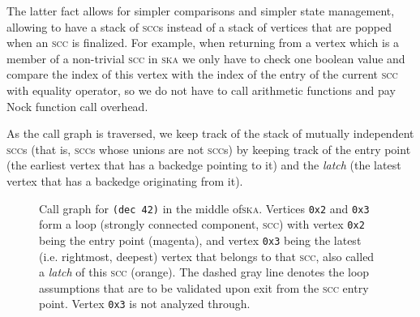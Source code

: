 \documentclass[twoside]{article}
\begin{document}
The latter fact allows for simpler comparisons and simpler state management, allowing to have a stack of \textsc{scc}s instead of a stack of vertices that are popped when an \textsc{scc} is finalized. For example, when returning from a vertex which is a member of a non-trivial \textsc{scc} in \textsc{ska} we only have to check one boolean value and compare the index of this vertex with the index of the entry of the current \textsc{scc} with equality operator, so we do not have to call arithmetic functions and pay Nock function call overhead.

As the call graph is traversed, we keep track of the stack of mutually independent \textsc{scc}s (that is, \textsc{scc}s whose unions are not \textsc{scc}s) by keeping track of
the entry point (the earliest vertex that has a backedge pointing to it) and the
\emph{latch} (the latest vertex that has a backedge originating from it).

\begin{figure}[h]
  \centering
  \caption{Call graph for \texttt{(dec 42)} in the middle of\textsc{ska}. Vertices \texttt{0x2} and \texttt{0x3} form a loop (strongly connected component, \textsc{scc}) with vertex \texttt{0x2} being the entry point (magenta), and vertex \texttt{0x3} being the latest (i.e. rightmost, deepest) vertex that belongs to that \textsc{scc}, also called a \emph{latch} of this \textsc{scc} (orange). The dashed gray line denotes the loop assumptions that are to be validated upon exit from the \textsc{scc} entry point. Vertex \texttt{0x3} is not analyzed through.}
  \label{fig:dec-ska}
\end{figure}
\end{document}
